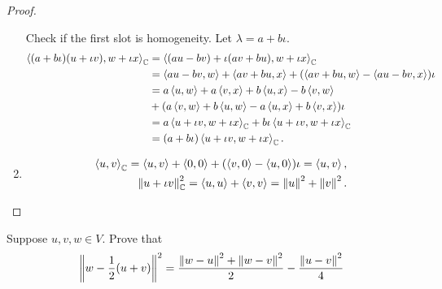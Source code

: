 \begin{proof}
\begin{enumerate}[label={(\alph*)}]
              Check if the first slot is homogeneity. Let $\lambda = a + b\iota$.
              \begin{align*}
                  \left\langle{(a + b\iota)(u  + \iota v), w + \iota x}\right\rangle_{\mathbb{C}} & = \left\langle{(au - bv) + \iota (av + bu), w + \iota x}\right\rangle_{\mathbb{C}}                                            \\
                                                                                   & = \left\langle{au - bv, w}\right\rangle + \left\langle{av + bu, x}\right\rangle + (\left\langle{av + bu, w}\right\rangle - \left\langle{au - bv, x}\right\rangle)\iota     \\
                                                                                   & = a\left\langle{u, w}\right\rangle + a\left\langle{v, x}\right\rangle + b\left\langle{u, x}\right\rangle - b\left\langle{v, w}\right\rangle                                \\
                                                                                   & + (a\left\langle{v, w}\right\rangle + b\left\langle{u, w}\right\rangle - a\left\langle{u, x}\right\rangle + b\left\langle{v, x}\right\rangle)\iota                         \\
                                                                                   & = a\left\langle{u + \iota v, w + \iota x}\right\rangle_{\mathbb{C}} + b\iota\left\langle{u + \iota v, w + \iota x}\right\rangle_{\mathbb{C}} \\
                                                                                   & = (a + b\iota)\left\langle{u + \iota v, w + \iota x}\right\rangle_{\mathbb{C}}.
              \end{align*}
        \item \[
                  \begin{split}
                      \left\langle{u, v}\right\rangle_{\mathbb{C}} = \left\langle{u, v}\right\rangle + \left\langle{0, 0}\right\rangle + (\left\langle{v, 0}\right\rangle - \left\langle{u, 0}\right\rangle)\iota = \left\langle{u, v}\right\rangle, \\
                      \left\Vert{u + \iota v}\right\Vert_{\mathbb{C}}^{2} = \left\langle{u, u}\right\rangle + \left\langle{v, v}\right\rangle = \left\Vert{u}\right\Vert^{2} + \left\Vert{v}\right\Vert^{2}.
                  \end{split}
              \]
    \end{enumerate}
\end{proof}
\newpage

\begin{exercise}\label{chapter6:sectionA:exercise31}
    Suppose $u, v, w \in V$. Prove that
    \[
        \left\Vert{w - \frac{1}{2}(u + v)}\right\Vert^{2} = \frac{\left\Vert{w - u}\right\Vert^{2} + \left\Vert{w - v}\right\Vert^{2}}{2} - \frac{\left\Vert{u - v}\right\Vert^{2}}{4}
    \]
\end{exercise}

